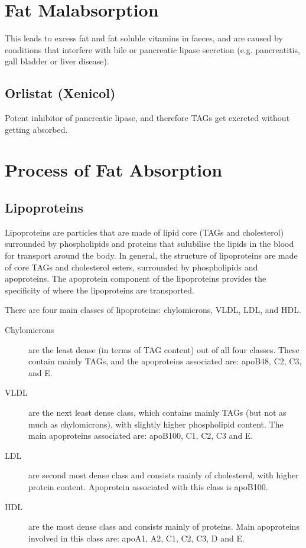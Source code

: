\section{Fat Malabsorption}

This leads to excess fat and fat soluble vitamins in faeces, and are caused by conditions that interfere with bile or pancreatic lipase secretion (e.g. pancreatitis, gall bladder or liver disease).

\subsection{Orlistat (Xenicol)}

Potent inhibitor of pancreatic lipase, and therefore TAGs get excreted without getting absorbed.

\section{Process of Fat Absorption}

\subsection{Lipoproteins}

Lipoproteins are particles that are made of lipid core (TAGs and cholesterol) surrounded by phospholipids and proteins that sulubilise the lipids in the blood for transport around the body.
In general, the structure of lipoproteins are made of core TAGs and cholesterol esters, surrounded by phospholipids and apoproteins.
The apoprotein component of the lipoproteins provides the specificity of where the lipoproteins are transported.

There are four main classes of lipoproteins: chylomicrons, VLDL, LDL, and HDL.
\begin{description}
\item[Chylomicrons] are the least dense (in terms of TAG content) out of all four classes. These contain mainly TAGs, and the apoproteins associated are: apoB48, C2, C3, and E.
\item[VLDL] are the next least dense class, which contains mainly TAGs (but not as much as chylomicrons), with slightly higher phospholipid content. The main apoproteins associated are: apoB100, C1, C2, C3 and E.
\item[LDL] are second most dense class and consists mainly of cholesterol, with higher protein content. Apoprotein associated with this class is apoB100.
\item[HDL] are the most dense class and consists mainly of proteins. Main apoproteins involved in this class are: apoA1, A2, C1, C2, C3, D and E.
\end{description}

